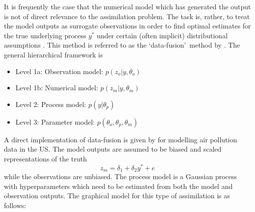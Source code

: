 \documentclass[10pt,a4paper]{article}
\begin{document}
It is frequently the case that the numerical model which has generated the output is not of direct relevance to the assimilation problem. The task is, rather, to treat the model outputs as surrogate observations in order to find optimal estimates for the true underlying process $y^*$ under certain (often implicit) distributional assumptions \citep{Berliner_2012}. This method is referred to as the \lq data-fusion\rq~method by \cite{Gelfand_2009}. The general hierarchical framework is
\begin{itemize}
\item Level 1a: Observation model: $p(z_o | y, \theta_o)$
\item Level 1b: Numerical model: $p(z_m | y, \theta_m)$
\item Level 2: Process model: $p(y | \theta_p)$
\item Level 3: Parameter model: $p(\theta_o, \theta_p, \theta_m)$
\end{itemize}

A direct implementation of data-fusion is given by \citep{Fuentes_2005} for modelling air pollution data in the US. The model outputs are assumed to be biased and scaled representations of the truth
\begin{equation}
z_m = \delta_1 + \delta_2y^* + e
\end{equation}
\noindent while the observations are unbiased. The process model is a Gaussian process with hyperparameters which need to be estimated from both the model and observation outputs. The graphical model for this type of assimilation is as follows:
\begin{figure}[h!]
\centering
{}
\end{figure}
\end{document}
